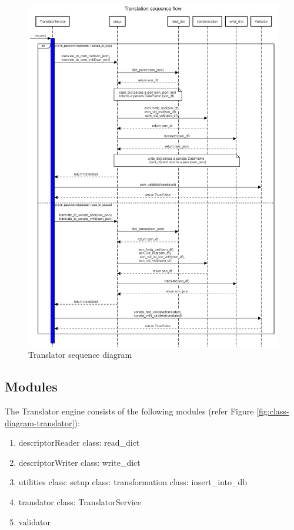 \begin{figure}[h!]
	\centering
	\includegraphics[width=1\linewidth]{"figures/translator_seq_diag"}
	\caption{Translator sequence diagram}
	\label{fig:sequence-diagram-translator}
\end{figure}


\subsection{Modules}
The Translator engine consists of the following modules (refer Figure  \ref{fig:class-diagram-translator}):
\begin{enumerate}
	\item descriptorReader
	\subitem class: read\_dict
	\item descriptorWriter
	\subitem class: write\_dict
	\item utilities
	\subitem class: setup
	\subitem class: transformation
	\subitem class: insert\_into\_db
	\item translator
	\subitem class: TranslatorService
	\item validator
	
\end{enumerate}

